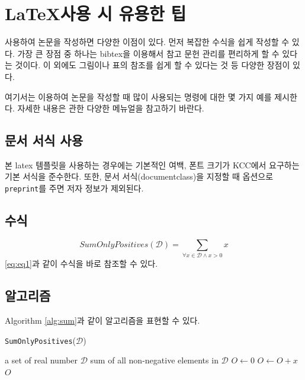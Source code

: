 \section{\LaTeX 사용 시 유용한 팁}

 사용하여 논문을 작성하면 다양한 이점이 있다.
먼저 복잡한 수식을 쉽게 작성할 수 있다.
가장 큰 장점 중 하나는 bibtex을 이용해서 참고 문헌 관리를 편리하게 할 수 있다는 것이다.
이 외에도 그림이나 표의 참조를 쉽게 할 수 있다는 것 등 다양한 장점이 있다.

여기서는  이용하여 논문을 작성할 때 많이 사용되는 명령에 대한 몇 가지 예를 제시한다.
자세한 내용은  관한 다양한 메뉴얼을 참고하기 바란다.

\subsection{문서 서식 사용}
본 latex 템플릿을 사용하는 경우에는 기본적인 여백, 폰트 크기가 KCC에서 요구하는 기본 서식을 준수한다.
또한, 문서 서식(documentclass)을 지정할 때 옵션으로 {\tt preprint}를 주면 저자 정보가 제외된다.


\subsection{수식}
\begin{equation}
\label{eq:eq1}
SumOnlyPositives(\mathcal{D}) = \sum_{\forall x \in \mathcal{D} \land x > 0 }x
\end{equation}
\eqref{eq:eq1}과 같이 수식을 바로 참조할 수 있다.


\subsection{알고리즘}
Algorithm \ref{alg:sum}과 같이 알고리즘을 표현할 수 있다.
\begin{algorithm}[!ht]
\label{alg:sum}
\caption[Short label]{\texttt{SumOnlyPositives}($\mathcal{D}$)}
\begin{algorithmic}[1]
\REQUIRE a set of real number $\mathcal{D}$ 
\ENSURE sum of all non-negative elements in $\mathcal{D}$ 
\STATE $O \leftarrow 0$
		\STATE $O \leftarrow O + x$
	\ENDIF
\ENDFOR
\RETURN $O$
\end{algorithmic}
\end{algorithm}

  
